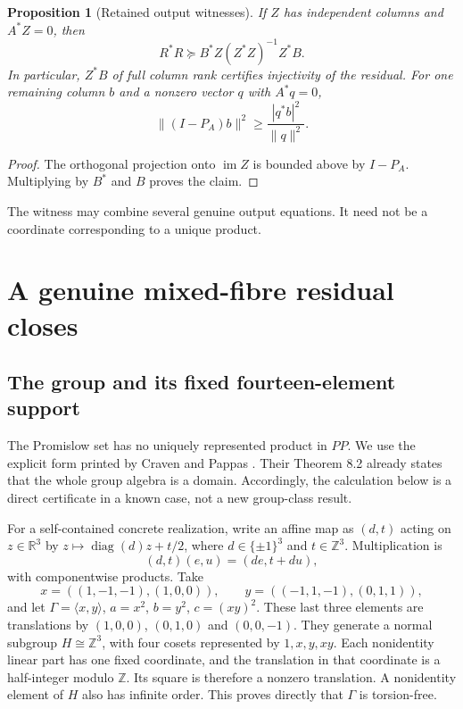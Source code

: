 \documentclass[11pt,a4paper,oneside]{report}
\newtheorem{proposition}[theorem]{Proposition}
\theoremstyle{definition}
\theoremstyle{remark}
\DeclareMathOperator{\diag}{diag}
\DeclareMathOperator{\im}{im}
\newcommand{\Z}{\mathbb Z}
\newcommand{\R}{\mathbb R}
\begin{document}
\begin{proposition}[Retained output witnesses]\label{M06:prop:witness}
If $Z$ has independent columns and $A^*Z=0$, then
\[
R^*R\succeq B^*Z(Z^*Z)^{-1}Z^*B.
\]
In particular, $Z^*B$ of full column rank certifies injectivity
of the residual. For one remaining column $b$ and a nonzero
vector $q$ with $A^*q=0$,
\[
\|(I-P_A)b\|^2\ge\frac{|q^*b|^2}{\|q\|^2}.
\]
\end{proposition}
\begin{proof}
The orthogonal projection onto $\im Z$ is bounded above by
$I-P_A$. Multiplying by $B^*$ and $B$ proves the claim.
\end{proof}
The witness may combine several genuine output equations.
It need not be a coordinate corresponding to a unique product.

\section{A genuine mixed-fibre residual closes}\label{M06:sec:promislow}

\subsection{The group and its fixed fourteen-element support}

The Promislow set has no uniquely represented product in $PP$.
We use the explicit form printed by Craven and Pappas
\cite[Section 12]{B:CP}. Their Theorem 8.2 already states that
the whole group algebra is a domain. Accordingly, the calculation
below is a direct certificate in a known case, not a new
group-class result.

For a self-contained concrete realization, write an affine map
as $(d,t)$ acting on $z\in\R^3$ by
$z\mapsto\diag(d)z+t/2$, where $d\in\{\pm1\}^3$ and $t\in\Z^3$.
Multiplication is
\[
(d,t)(e,u)=(de,t+du),
\]
with componentwise products. Take
\[
x=((1,-1,-1),(1,0,0)),\qquad
y=((-1,1,-1),(0,1,1)),
\]
and let $\Gamma=\langle x,y\rangle$,
$a=x^2$, $b=y^2$, $c=(xy)^2$. These last three elements are
translations by $(1,0,0)$, $(0,1,0)$ and $(0,0,-1)$.
They generate a normal subgroup $H\cong\Z^3$, with four cosets
represented by $1,x,y,xy$. Each nonidentity linear part has one
fixed coordinate, and the translation in that coordinate is a
half-integer modulo $\Z$. Its square is therefore a nonzero
translation. A nonidentity element of $H$ also has infinite order.
This proves directly that $\Gamma$ is torsion-free.
\end{document}
